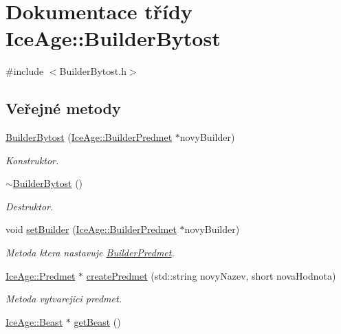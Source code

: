 \hypertarget{classIceAge_1_1BuilderBytost}{}\section{Dokumentace třídy Ice\+Age\+:\+:Builder\+Bytost}
\label{classIceAge_1_1BuilderBytost}


{\ttfamily \#include $<$Builder\+Bytost.\+h$>$}

\subsection*{Veřejné metody}
\begin{DoxyCompactItemize}
\item 
\hyperlink{classIceAge_1_1BuilderBytost_a4f7fcb1e80137c5555a0eb004fca5c19}{Builder\+Bytost} (\hyperlink{classIceAge_1_1BuilderPredmet}{Ice\+Age\+::\+Builder\+Predmet} $\ast$novy\+Builder)
\begin{DoxyCompactList}\small\item\em Konstruktor. \end{DoxyCompactList}\item 
\hyperlink{classIceAge_1_1BuilderBytost_ac090a25d213bcbe4ca3a9d7a21db1d36}{$\sim$\+Builder\+Bytost} ()
\begin{DoxyCompactList}\small\item\em Destruktor. \end{DoxyCompactList}\item 
void \hyperlink{classIceAge_1_1BuilderBytost_a4fcc673dabd0c27c892698e4956d86ca}{set\+Builder} (\hyperlink{classIceAge_1_1BuilderPredmet}{Ice\+Age\+::\+Builder\+Predmet} $\ast$novy\+Builder)
\begin{DoxyCompactList}\small\item\em Metoda ktera nastavuje \hyperlink{classIceAge_1_1BuilderPredmet}{Builder\+Predmet}. \end{DoxyCompactList}\item 
\hyperlink{classIceAge_1_1Predmet}{Ice\+Age\+::\+Predmet} $\ast$ \hyperlink{classIceAge_1_1BuilderBytost_a3b86534905ea6bb1702a6e8d6d3729c7}{create\+Predmet} (std\+::string novy\+Nazev, short nova\+Hodnota)
\begin{DoxyCompactList}\small\item\em Metoda vytvarejici predmet. \end{DoxyCompactList}\item 
\hyperlink{classIceAge_1_1Beast}{Ice\+Age\+::\+Beast} $\ast$ \hyperlink{classIceAge_1_1BuilderBytost_a0a5a5246a7b192effd4993bfcf4b23f3}{get\+Beast} ()

\end{DoxyCompactItemize}
